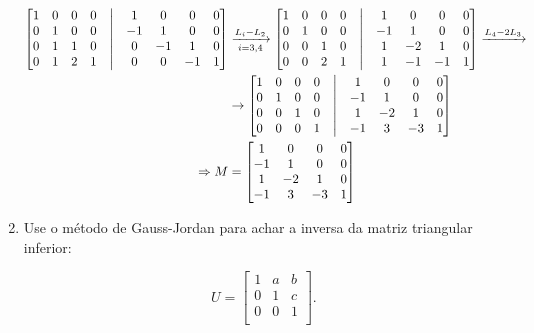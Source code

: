 \documentclass[leqno]{article}
\begin{document}
\begin{enumerate}
    \begin{align*}
    \begin{bmatrix}
    1 & 0 & 0 & 0 & \bigm| & 1 & 0 & 0 & 0\\
    0 & 1 & 0 & 0 & \bigm| & -1 & 1 & 0 & 0\\
    0 & 1 & 1 & 0 & \bigm| & 0 & -1 & 1 & 0\\
    0 & 1 & 2 & 1 & \bigm| & 0 & 0 & -1 & 1\\
    \end{bmatrix}&\xrightarrow[i=3,4]{L_{i}-L_2}\begin{bmatrix}
    1 & 0 & 0 & 0 & \bigm| & 1 & 0 & 0 & 0\\
    0 & 1 & 0 & 0 & \bigm| & -1 & 1 & 0 & 0\\
    0 & 0 & 1 & 0 & \bigm| & 1 & -2 & 1 & 0\\
    0 & 0 & 2 & 1 & \bigm| & 1 & -1 & -1 & 1\\
    \end{bmatrix}\xrightarrow{L_4-2L_3}\\
    &\rightarrow\begin{bmatrix}
    1 & 0 & 0 & 0 & \bigm| & 1 & 0 & 0 & 0\\
    0 & 1 & 0 & 0 & \bigm| & -1 & 1 & 0 & 0\\
    0 & 0 & 1 & 0 & \bigm| & 1 & -2 & 1 & 0\\
    0 & 0 & 0 & 1 & \bigm| & -1 & 3 & -3 & 1\\
    \end{bmatrix}\\
    \Rightarrow M&=\begin{bmatrix}
    1 & 0 & 0 & 0\\
    -1 & 1 & 0 & 0\\
    1 & -2 & 1 & 0\\
    -1 & 3 & -3 & 1\\
    \end{bmatrix}
    \end{align*}
    \newpage
    
    \item Use o método de Gauss-Jordan para achar a inversa da matriz triangular inferior:
    
    $$U=\begin{bmatrix}
    1 & a & b\\
    0 & 1 & c\\
    0 & 0 & 1\\
    \end{bmatrix}\text{.}$$
    

\end{enumerate}
\end{document}
